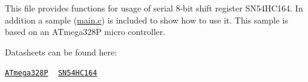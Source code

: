This file provides functions for usage of serial 8-\/bit shift register S\+N54\+H\+C164. In addition a sample (\hyperlink{main_8c}{main.\+c}) is included to show how to use it. This sample is based on an A\+Tmega328\+P micro controller.

Datasheets can be found here\+:

\href{../datasheets/Atmel-42735-8-bit-AVR-Microcontroller-ATmega328-328P_Datasheet.pdf}{\tt A\+Tmega328\+P} ~\newline
 \href{../datasheets/164445-da-01-en-CMOS_IC_SN74HC164N_DIP14_TID.pdf}{\tt S\+N54\+H\+C164} 